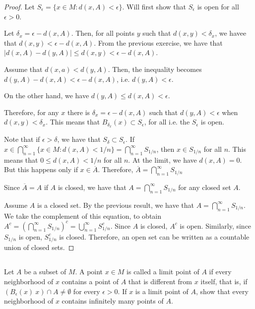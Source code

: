 \begin{proof}
Let $S_\epsilon = \{x \in M: d(x,A) < \epsilon\}$. Will first show that $S_\epsilon$ is open for all $\epsilon > 0$. 

Let $\delta_x = \epsilon - d(x,A)$. Then, for all points $y$ such that $d(x,y) < \delta_x$, we havee that $d(x,y) < \epsilon - d(x,A)$. From the previous exercise, we have that $|d(x, A) - d(y, A)| \leq d(x,y) < \epsilon - d(x,A)$.

Assume that $d(x,a) < d(y,A)$. Then, the inequality becomes $d(y,A) - d(x,A) < \epsilon - d(x,A)$, i.e. $d(y,A) < \epsilon$.

On the other hand, we have $d(y,A) \leq d(x,A) < \epsilon$.

Therefore, for any $x$ there is $\delta_x = \epsilon - d(x,A)$ such that $d(y,A) < \epsilon$ when $d(x,y) < \delta_x$. This means that $B_{\delta_x}(x) \subset S_\epsilon$, for all i.e. the $S_\epsilon$ is open.

\vspace{1em}

Note that if $\epsilon > \delta$, we have that $S_\delta \subset S_\epsilon$. If $x \in \bigcap_{n=1}^\infty \{x \in M: d(x,A) < 1/n\} = \bigcap_{n=1}^\infty S_{1/n}$, then $x \in S_{1/n}$ for all $n$. This means that $0 \leq d(x, A) < 1/n$ for all $n$. At the limit, we have $d(x,A) = 0$. But this happens only if $x \in \overline{A}$. Therefore, $\overline{A} = \bigcap_{n=1}^\infty S_{1/n}$

Since $\overline{A} = A$ if $A$ is closed, we have that $A = \bigcap_{n=1}^\infty S_{1/n}$ for any closed set $A$.

\vspace{1em}

Assume $A$ is a closed set. By the previous result, we have that $A = \bigcap_{n=1}^\infty S_{1/n}$. We take the complement of this equation, to obtain $A^c = (\bigcap_{n=1}^\infty S_{1/n})^c = \bigcup_{n=1}^\infty S_{1/n}^c$. Since $A$ is closed, $A^c$ is open. Similarly, since $S_{1/n}$ is open, $S_{1/n}^c$ is closed. Therefore, an open set can be written as a countable union of closed sets.


\end{proof}


\subsection{} Let $A$ be a subset of $M$. A point $x \in M$ is called a limit point of $A$ if every neighborhood of $x$ contains a  point  of $A$ that is different from $x$ itself,  that is, if $(B_\epsilon(x) \ {x}) \cap A \neq \emptyset$ for every $\epsilon > 0$. If $x$ is a limit point of $A$, show that every neighborhood of $x$ contains infinitely many points of $A$.

